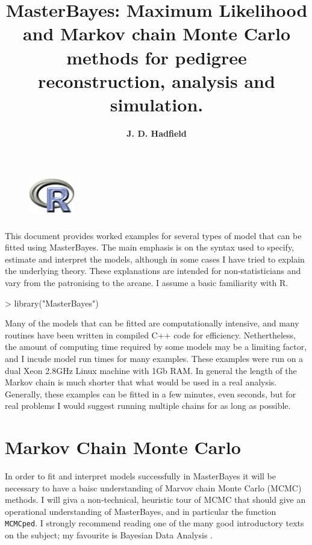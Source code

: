 \documentclass{article}
\title{\bf{\Large{MasterBayes: Maximum Likelihood and Markov chain Monte Carlo methods for pedigree reconstruction, analysis and simulation.}}}
\author{\bf{\large{J. D. Hadfield}}}
\begin{document}
\maketitle
\begin{figure}[!h]
\begin{center}
\includegraphics[height=2cm, width=2cm]{Rlogo}
\end{center}
\end{figure}

\newpage

\tableofcontents

\newpage

This document provides worked examples for several types of model that can be fitted using MasterBayes.  The main emphasis is on the syntax used to specify, estimate and interpret the models, although in some cases I have tried to explain the underlying theory.  These explanations are intended for non-statisticians and vary from the patronising to the arcane. I assume a basic familiarity with R.

\begin{Schunk}
\begin{Sinput}
> library("MasterBayes")
\end{Sinput}
\end{Schunk}

Many of the models that can be fitted are computationally intensive, and many routines have been written in compiled C++ code for efficiency.  Nethertheless, the amount of computing time required by some models may be a limiting factor, and I incude model run times for many examples.  These examples were run on a dual Xeon 2.8GHz Linux machine with 1Gb RAM. In general the length of the Markov chain is much shorter that what would be used in a real analysis.  Generally, these examples can be fitted in a few minutes, even seconds, but for real problems I would suggest running multiple chains for as long as possible.  


\section{\large{Markov Chain Monte Carlo}}
\label{MCMC-sec}

In order to fit and interpret models successfully in MasterBayes it will be necessary to have a baisc understanding of Marvov chain Monte Carlo (MCMC) methods.  I will giva a non-technical, heuristic tour of MCMC that should give an operational understanding of MasterBayes, and in particular the function \texttt{MCMCped}. I strongly recommend reading one of the many good introductory texts on the subject; my favourite is Bayesian Data Analysis \citep{Gelman.2004}.\\  
\end{document}
